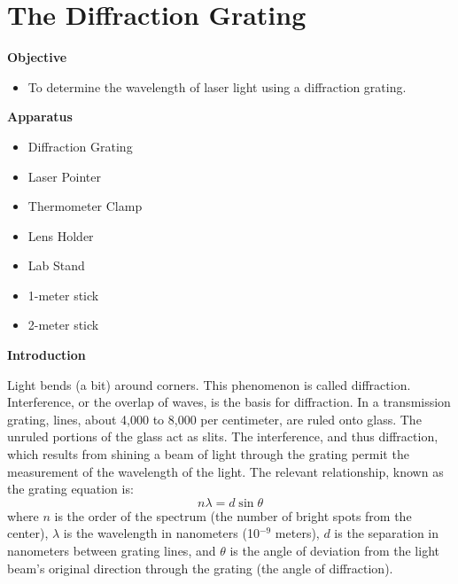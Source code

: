 
\section{The Diffraction Grating}

\makelabheader %

\bigskip
\textbf{Objective}

\begin{itemize}
\vspace{-0.12in}  %
\item To determine the wavelength of laser light using a diffraction grating.
\end{itemize}

\textbf{Apparatus}
\begin{itemize}
\item Diffraction Grating 
\item Laser Pointer
\item Thermometer Clamp
\item Lens Holder
\item Lab Stand
\item 1-meter stick 
\item 2-meter stick
\end{itemize}

\textbf{Introduction}

Light bends (a bit) around corners. This phenomenon is called diffraction.
Interference, or the overlap of waves, is the basis for diffraction.
In a transmission grating, lines, about 4,000 to 8,000 per centimeter,
are ruled onto glass. The unruled portions of the glass act as slits.
The interference, and thus diffraction, which results from shining
a beam of light through the grating permit the measurement of the
wavelength of the light. The relevant relationship, known as the grating
equation is:
\begin{displaymath} n\lambda = d \sin \theta \end{displaymath}
where $n$ is the order of the spectrum (the number of bright spots
from the center), $\lambda$ is the wavelength in nanometers (10\( ^{-9} \)
meters), $d$ is the separation in nanometers between grating lines,
and $\theta$ is the angle of deviation from the light beam's original
direction through the grating (the angle of diffraction).

